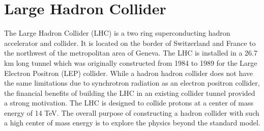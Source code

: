 \chapter{Large Hadron Collider}
The Large Hadron Collider (LHC) is a two ring superconducting hadron 
accelerator and collider. It is located on the border of Switzerland
and France to the northwest of the metropolitan area of Geneva.
The LHC is installed in a 26.7 km long tunnel which was originally constructed
from 1984 to 1989 for the Large Electron Positron (LEP) collider. 
While a hadron hadron collider does not have the same limitations
due to synchrotron radiation as an electron positron collider, 
the financial benefits of building the LHC in an existing collider tunnel 
provided a strong motivation. 
The LHC is designed to collide protons at a center of mass energy of 14 TeV.
The overall purpose of constructing a hadron collider with such a high
center of mass energy is to explore the physics beyond the standard model.  


